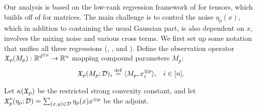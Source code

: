 Our analysis is based on the low-rank regression framework of
\citet{Tomioka2011} for tensors, which builds off of
\citet{NegahbanWainwright2009} for matrices.
The main challenge is to control the noise $\eta_p(x)$,
which in addition to containing the usual Gaussian part, is also dependent on
$x$, involves the mixing noise and various cross terms.
We first set up some notation that unifies all three regressions (, , and ).
Define the observation operator $\operatorname{\mathfrak{X}}_p(M_p) : \mathbb{R}^{d^{\otimes p}} \to \mathbb{R}^{n}$
mapping compound parameters $M_p$:
\begin{align}
\operatorname{\mathfrak{X}}_p(M_p; \mathcal{D})_i &\stackrel{\rm def}{=} \langle M_p, x^{\otimes p}_i \rangle, & i \in [n].
\end{align}

Let $\kappa(\operatorname{\mathfrak{X}}_p)$ be the restricted strong convexity constant,
and let $\operatorname{\mathfrak{X}}^*_p(\eta_p; \mathcal{D}) = \sum_{(x,y) \in \mathcal{D}} \eta_p(x) x^{\otimes p}$
be the adjoint.








